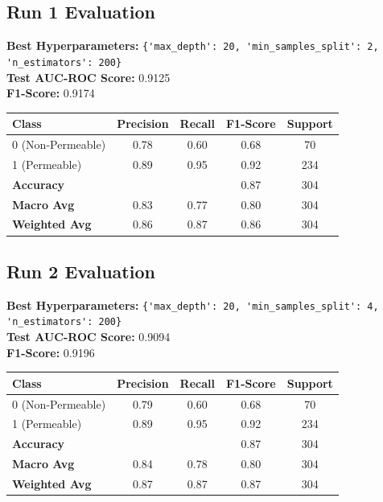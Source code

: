 \documentclass{article}
\begin{document}
\subsection*{Run 1 Evaluation}

\textbf{Best Hyperparameters:} \verb|{'max_depth': 20, 'min_samples_split': 2, 'n_estimators': 200}|\\
\textbf{Test AUC-ROC Score:} 0.9125\\
\textbf{F1-Score:} 0.9174

\begin{table}[htbp]
\centering
\label{tab:rf_class_report_1}
\begin{tabular}{lcccc}
\toprule
\textbf{Class} & \textbf{Precision} & \textbf{Recall} & \textbf{F1-Score} & \textbf{Support} \\
\midrule
0 (Non-Permeable) & 0.78 & 0.60 & 0.68 & 70 \\
1 (Permeable)     & 0.89 & 0.95 & 0.92 & 234 \\
\midrule
\textbf{Accuracy}     &      &      & 0.87 & 304 \\
\textbf{Macro Avg}    & 0.83 & 0.77 & 0.80 & 304 \\
\textbf{Weighted Avg} & 0.86 & 0.87 & 0.86 & 304 \\
\bottomrule
\end{tabular}
\end{table}

\subsection*{Run 2 Evaluation}

\textbf{Best Hyperparameters:} \verb|{'max_depth': 20, 'min_samples_split': 4, 'n_estimators': 200}|\\
\textbf{Test AUC-ROC Score:} 0.9094\\
\textbf{F1-Score:} 0.9196

\begin{table}[htbp]
\centering
\label{tab:rf_class_report_2}
\begin{tabular}{lcccc}
\toprule
\textbf{Class} & \textbf{Precision} & \textbf{Recall} & \textbf{F1-Score} & \textbf{Support} \\
\midrule
0 (Non-Permeable) & 0.79 & 0.60 & 0.68 & 70 \\
1 (Permeable)     & 0.89 & 0.95 & 0.92 & 234 \\
\midrule
\textbf{Accuracy}     &      &      & 0.87 & 304 \\
\textbf{Macro Avg}    & 0.84 & 0.78 & 0.80 & 304 \\
\textbf{Weighted Avg} & 0.87 & 0.87 & 0.87 & 304 \\
\bottomrule
\end{tabular}
\end{table}
\end{document}
